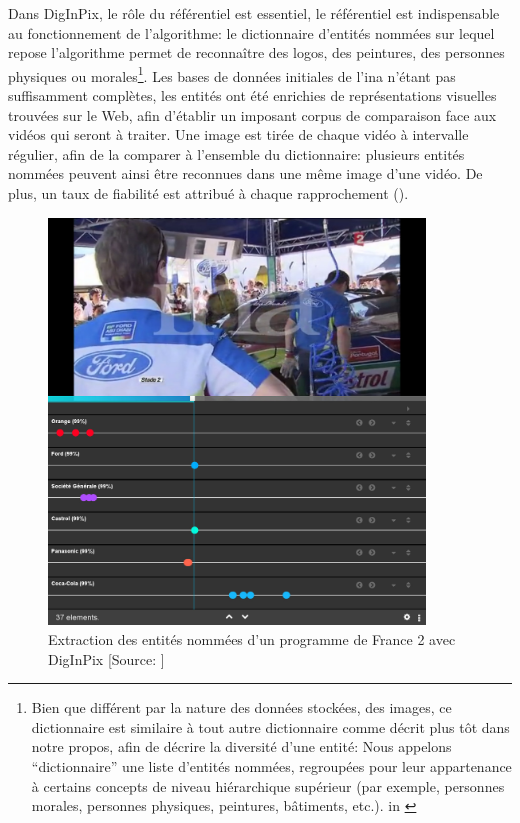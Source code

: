 Dans DigInPix, le rôle du référentiel est essentiel, le référentiel est indispensable au fonctionnement de l'algorithme: le dictionnaire d'entités nommées sur lequel repose l'algorithme permet de reconnaître des logos, des peintures, des personnes physiques ou morales\footnote{Bien que différent par la nature des données stockées, des images, ce dictionnaire est similaire à tout autre dictionnaire comme décrit plus tôt dans notre propos, afin de décrire la diversité d'une entité: \og Nous appelons “dictionnaire” une liste d'entités nommées, regroupées pour leur appartenance à certains concepts de niveau hiérarchique supérieur (par exemple, personnes morales, personnes physiques, peintures, bâtiments, etc.).\fg{} in \cite{institut_national_de_laudiovisuel_diginpix_nodate}}. Les bases de données initiales de l'\ac{ina} n'étant pas suffisamment complètes, les entités ont été enrichies de représentations visuelles trouvées sur le Web, afin d'établir un imposant corpus de comparaison face aux vidéos qui seront à traiter. Une image est tirée de chaque vidéo à intervalle régulier, afin de la comparer à l'ensemble du dictionnaire: plusieurs entités nommées peuvent ainsi être reconnues dans une même image d'une vidéo. De plus, un taux de fiabilité est attribué à chaque rapprochement ().
\begin{figure}[!h]
	\centering
	\includegraphics[width=10cm]{images/diginpix_resultat.jpg}
	\caption[Extraction des entités nommées d'un programme de France 2 avec DigInPix]{Extraction des entités nommées d'un programme de France 2 avec DigInPix [Source: \cite{institut_national_de_laudiovisuel_diginpix_nodate}]}
	\label{diginpix_result}
\end{figure}


